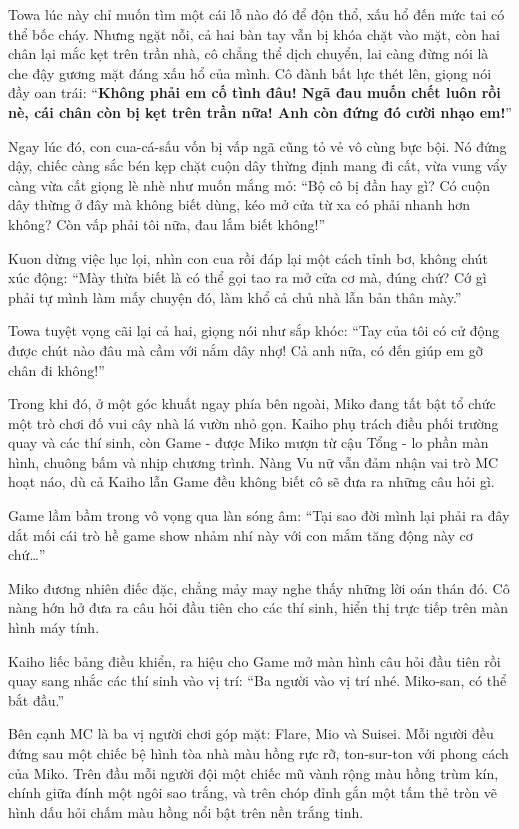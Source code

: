 \documentclass[../main.tex]{subfiles}
\begin{document}
Towa lúc này chỉ muốn tìm một cái lỗ nào đó để độn thổ, xấu hổ đến mức tai có thể bốc cháy. Nhưng ngặt nỗi, cả hai bàn tay vẫn bị khóa chặt vào mặt, còn hai chân lại mắc kẹt trên trần nhà, cô chẳng thể dịch chuyển, lai càng đừng nói là che đậy gương mặt đáng xấu hổ của mình. Cô đành bất lực thét lên, giọng nói đầy oan trái: ``\textbf{Không phải em cố tình đâu! Ngã đau muốn chết luôn rồi nè, cái chân còn bị kẹt trên trần nữa! Anh còn đứng đó cười nhạo em!}''

Ngay lúc đó, con cua-cá-sấu vốn bị vấp ngã cũng tỏ vẻ vô cùng bực bội. Nó đứng dậy, chiếc càng sắc bén kẹp chặt cuộn dây thừng định mang đi cất, vừa vung vẩy càng vừa cất giọng lè nhè như muốn mắng mỏ: ``Bộ cô bị đần hay gì? Có cuộn dây thừng ở đây mà không biết dùng, kéo mở cửa từ xa có phải nhanh hơn không? Còn vấp phải tôi nữa, đau lắm biết không!''

Kuon dừng việc lục lọi, nhìn con cua rồi đáp lại một cách tỉnh bơ, không chút xúc động: ``Mày thừa biết là có thể gọi tao ra mở cửa cơ mà, đúng chứ? Cớ gì phải tự mình làm mấy chuyện đó, làm khổ cả chủ nhà lẫn bản thân mày.''

Towa tuyệt vọng cãi lại cả hai, giọng nói như sắp khóc: ``Tay của tôi có cử động được chút nào đâu mà cầm với nắm dây nhợ! Cả anh nữa, có đến giúp em gỡ chân đi không!''

\ct

Trong khi đó, ở một góc khuất ngay phía bên ngoài, Miko đang tất bật tổ chức một trò chơi đố vui cây nhà lá vườn nhỏ gọn. Kaiho phụ trách điều phối trường quay và các thí sinh, còn Game - được Miko mượn từ cậu Tổng - lo phần màn hình, chuông bấm và nhịp chương trình. Nàng Vu nữ vẫn đảm nhận vai trò MC hoạt náo, dù cả Kaiho lẫn Game đều không biết cô sẽ đưa ra những câu hỏi gì.

Game lầm bầm trong vô vọng qua làn sóng âm: ``Tại sao đời mình lại phải ra đây dắt mối cái trò hề game show nhảm nhí này với con mắm tăng động này cơ chứ\dots''

Miko đương nhiên điếc đặc, chẳng mảy may nghe thấy những lời oán thán đó. Cô nàng hớn hở đưa ra câu hỏi đầu tiên cho các thí sinh, hiển thị trực tiếp trên màn hình máy tính.

Kaiho liếc bảng điều khiển, ra hiệu cho Game mở màn hình câu hỏi đầu tiên rồi quay sang nhắc các thí sinh vào vị trí: ``Ba người vào vị trí nhé. Miko-san, có thể bắt đầu.''

Bên cạnh MC là ba vị người chơi góp mặt: Flare, Mio và Suisei. Mỗi người đều đứng sau một chiếc bệ hình tòa nhà màu hồng rực rỡ, ton-sur-ton với phong cách của Miko. Trên đầu mỗi người đội một chiếc mũ vành rộng màu hồng trùm kín, chính giữa đính một ngôi sao trắng, và trên chóp đỉnh gắn một tấm thẻ tròn vẽ hình dấu hỏi chấm màu hồng nổi bật trên nền trắng tinh.
\end{document}

